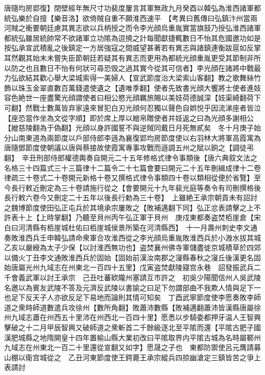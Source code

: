 唐隨均房郢復】閉壁經年無尺寸功裴度屢言其軍無政九月癸酉以韓弘為淮西諸軍都統弘樂於自擅【樂音洛】欲倚賊自重不願淮西速平　【考異曰舊傳曰弘鎮汴州當兩河賊之衝要朝廷慮其異志欲以兵柄授之而令李光顔烏重胤實當旗鼓乃授弘淮西諸軍都統弘雖居統帥常不欲諸軍立功隂為逗撓之計每聞獻捷輒數日不怡其危國邀功如是按弘承宣武積亂之後鎮定一方居強寇之間威望甚著若有異志與諸鎮連衡跋扈如反掌耳然觀其始末未嘗失臣節朝廷若疑其有異志而更用為都統光顔重胤更受其節制非所以防之也且數日不怡有何狀可尋恐毁之過其實今從其可信者】李光顔在諸將中戰最力弘欲結其歡心舉大梁城索得一美婦人【宣武節度治大梁索山客翻】教之歌舞絲竹飾以珠玉金翠直數百萬錢遣使遺之【遺唯季翻】使者先致書光顔大饗將士使者進妓容色絶世一座盡驚光顔謂使者曰相公愍光顔羈旅賜以美妓荷德誠深【妓渠綺翻荷下可翻】然戰士數萬皆弃家遠來冒犯白刃光顔何忍獨以聲色自娯悦乎因流涕座者皆泣【座恐當作坐為文從字順】即於席上厚以繒帛贈使者并妓返之曰為光顔多謝相公【繒慈陵翻為于偽翻】光顔以身許國誓不與逆賊同戴日月死無貳矣　冬十月庚子始分山南東道為兩節度以戶部侍郎李遜為襄復郢均房節度使以右羽林大將軍高霞寓為唐隨鄧節度使朝議以唐與蔡接故使霞寓專事攻戰而遜調五州之賦以餉之【調徒弔翻】　辛丑刑部侍郎權德輿奏自開元二十五年修格式律令事類後【唐六典叙文法之名格三十四篇式三十三篇律十二篇令二十七篇會要曰開元二十五年刪緝成律十二卷律疏三十卷式二十卷開元新格十卷又撰格式律令事類四十卷以類相從便於省覽】至今長行敕近刪定為三十卷請施行從之【會要開元十九年裴光庭等奏令有司刪撰格後長行敕六卷今又刪定二十五年以後長行勅為三十卷】　上雖絶王承宗朝貢未有詔討之魏博節度使田弘正屯兵於其境承宗屢敗之【敗補邁翻下同】弘正忿表請擊之上不許表十上【上時掌翻】乃聽至貝州丙午弘正軍于貝州　庚戍東都奏盗焚栢崖倉【宋白曰河清縣有栢崖城杜佑曰栢崖城侯景所築在河清縣西】　十一月壽州刺史李文通奏敗淮西兵壬申韓弘請命衆軍合攻淮西從之李光顔烏重胤敗淮西兵於小溵水拔其城乙亥以嚴綬為太子少保【以討淮西無功也】盗焚襄州佛寺軍儲盡徙京城積草於四郊以備火丁丑李文通敗淮西兵於固始【固始前漢汝南郡之寖縣春秋之寖丘後漢更名固始唐屬光州九域志在州東北一百四十五里】戊寅盗焚獻陵寢宫永巷　詔發振武兵二千會義武軍以討王承宗　己丑吐蕃欵隴州塞請互市許之　初吳少陽聞信州人吳武陵名邀以為賓友武陵不答及元濟反武陵以書諭之曰足下勿謂部曲不我欺人情與足下一也足下反天子人亦欲反足下易地而論則其情可知矣　丁酉武寧節度使李愿奏敗李師道之衆時師道數遣兵攻徐州【數所角翻】敗蕭沛數縣【敗補邁翻蕭沛皆漢縣唐屬徐州九域志蕭在州西五十里沛在州西北一百四十里】愿悉以步騎委都押牙温人王智興擊破之十二月甲辰智興又破師道之衆斬首二千餘級逐北至平隂而還【平隂古肥子國漢肥城縣之地隋開皇十四年置榆山縣大業初改曰平隂取界内平隂古城為名時屬鄆州九域志在州東北一百二十里還從宣翻又如字】愿晟之子也　東都防禦使呂元膺請募山棚以衛宫城從之　乙丑河東節度使王鍔薨王承宗縱兵四掠幽滄定三鎮皆苦之爭上表請討

